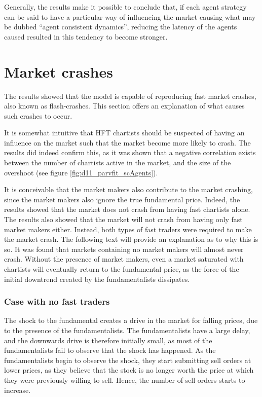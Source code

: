 Generally, the results make it possible to conclude that, if each agent strategy can be said to have a particular way of influencing the market causing what may be dubbed ``agent consistent dynamics'', reducing the latency of the agents caused  resulted in this tendency to become stronger.



\section{Market crashes}
The results showed that the model is capable of reproducing fast market crashes, also known as flash-crashes. This section offers an explanation of what causes such crashes to occur.

It is somewhat intuitive that HFT chartists should be suspected of having an influence on the market such that the market become more likely to crash. The results did indeed confirm this, as it was shown that a negative correlation exists between the number of chartists active in the market, and the size of the overshoot (see figure \ref{fig:d11_parvfit_scAgents}). 

It is conceivable that the market makers also contribute to the market crashing, since the market makers also ignore the true fundamental price. Indeed, the results showed that the market does not crash from having fast chartists alone. The results also showed that the market will not crash from having only fast market makers either. Instead, both types of fast traders were required to make the market crash. The following text will provide an explanation as to why this is so. It was found that markets containing no market makers will almost never crash. Without the presence of market makers, even a market saturated with chartists will eventually return to the fundamental price, as the force of the initial downtrend created by the fundamentalists dissipates. 


\subsubsection*{Case with no fast traders}
The shock to the fundamental creates a drive in the market for falling prices, due to the presence of the fundamentalists. The fundamentalists have a large delay, and the downwards drive is therefore initially small, as most of the fundamentalists fail to observe that the shock has happened. As the fundamentalists begin to observe the shock, they start submitting sell orders at lower prices, as they believe that the stock is no longer worth the price at which they were previously willing to sell. Hence, the number of sell orders starts to increase. 

